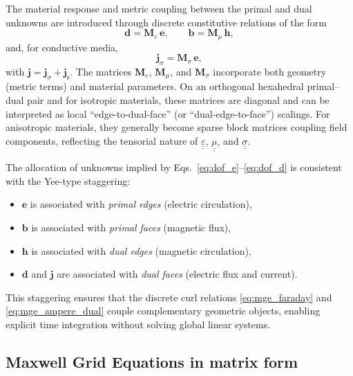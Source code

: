 The material response and metric coupling between the primal and dual unknowns are introduced through discrete constitutive relations of the form
\begin{equation}
\mathbf{d} = \mathbf{M}_{\varepsilon}\,\mathbf{e}, 
\qquad
\mathbf{b} = \mathbf{M}_{\mu}\,\mathbf{h},
\label{eq:constitutive_discrete}
\end{equation}
and, for conductive media,
\begin{equation}
\mathbf{j}_{\sigma} = \mathbf{M}_{\sigma}\,\mathbf{e},
\label{eq:constitutive_sigma_discrete}
\end{equation}
with $\mathbf{j} = \mathbf{j}_{\sigma} + \mathbf{j}_{\mathrm{s}}$. The matrices $\mathbf{M}_{\varepsilon}$, $\mathbf{M}_{\mu}$, and $\mathbf{M}_{\sigma}$ incorporate both geometry (metric terms) and material parameters. On an orthogonal hexahedral primal--dual pair and for isotropic materials, these matrices are diagonal and can be interpreted as local ``edge-to-dual-face'' (or ``dual-edge-to-face'') scalings. For anisotropic materials, they generally become sparse block matrices coupling field components, reflecting the tensorial nature of $\underline{\underline{\varepsilon}}$, $\underline{\underline{\mu}}$, and $\underline{\underline{\sigma}}$.

The allocation of unknowns implied by Eqs.~\eqref{eq:dof_e}--\eqref{eq:dof_d} is consistent with the Yee-type staggering:
\begin{itemize}
  \item $\mathbf{e}$ is associated with \emph{primal edges} (electric circulation),
  \item $\mathbf{b}$ is associated with \emph{primal faces} (magnetic flux),
  \item $\mathbf{h}$ is associated with \emph{dual edges} (magnetic circulation),
  \item $\mathbf{d}$ and $\mathbf{j}$ are associated with \emph{dual faces} (electric flux and current).
\end{itemize}
This staggering ensures that the discrete curl relations \eqref{eq:mge_faraday} and \eqref{eq:mge_ampere_dual} couple complementary geometric objects, enabling explicit time integration without solving global linear systems.

\subsection{Maxwell Grid Equations in matrix form}
\label{sec:mge_matrix_form}

